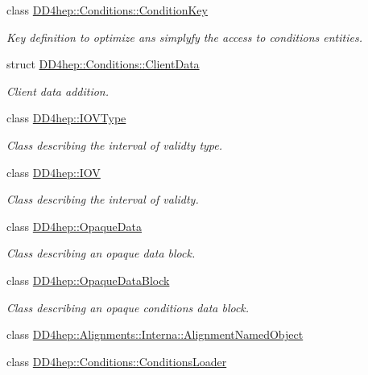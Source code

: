 \begin{DoxyCompactItemize}
class \hyperlink{class_d_d4hep_1_1_conditions_1_1_condition_key}{DD4hep::Conditions::ConditionKey}
\begin{DoxyCompactList}\small\item\em Key definition to optimize ans simplyfy the access to conditions entities. \item\end{DoxyCompactList}\item 
struct \hyperlink{struct_d_d4hep_1_1_conditions_1_1_client_data}{DD4hep::Conditions::ClientData}
\begin{DoxyCompactList}\small\item\em Client data addition. \item\end{DoxyCompactList}\item 
class \hyperlink{class_d_d4hep_1_1_i_o_v_type}{DD4hep::IOVType}
\begin{DoxyCompactList}\small\item\em Class describing the interval of validty type. \item\end{DoxyCompactList}\item 
class \hyperlink{class_d_d4hep_1_1_i_o_v}{DD4hep::IOV}
\begin{DoxyCompactList}\small\item\em Class describing the interval of validty. \item\end{DoxyCompactList}\item 
class \hyperlink{class_d_d4hep_1_1_opaque_data}{DD4hep::OpaqueData}
\begin{DoxyCompactList}\small\item\em Class describing an opaque data block. \item\end{DoxyCompactList}\item 
class \hyperlink{class_d_d4hep_1_1_opaque_data_block}{DD4hep::OpaqueDataBlock}
\begin{DoxyCompactList}\small\item\em Class describing an opaque conditions data block. \item\end{DoxyCompactList}\item 
class \hyperlink{class_d_d4hep_1_1_alignments_1_1_interna_1_1_alignment_named_object}{DD4hep::Alignments::Interna::AlignmentNamedObject}
\item 
class \hyperlink{class_d_d4hep_1_1_conditions_1_1_conditions_loader}{DD4hep::Conditions::ConditionsLoader}

\end{DoxyCompactItemize}
